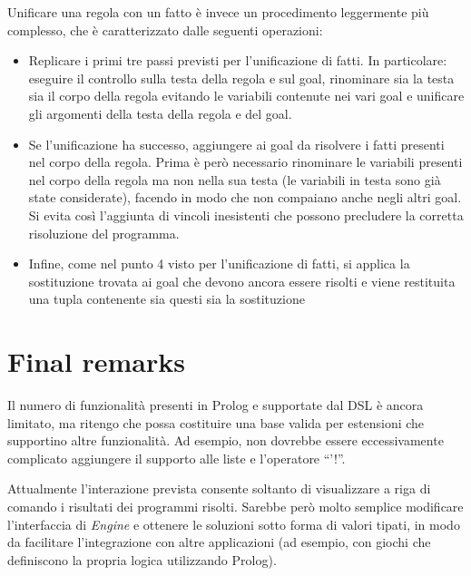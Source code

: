 Unificare una regola con un fatto è invece un procedimento leggermente più complesso, che è caratterizzato dalle seguenti operazioni:

\begin{itemize}
\item Replicare i primi tre passi previsti per l'unificazione di fatti. In particolare: eseguire il controllo sulla testa della regola e sul goal, rinominare sia la testa sia il corpo della regola evitando le variabili contenute nei vari goal e unificare gli argomenti della testa della regola e del goal.
\item Se l'unificazione ha successo, aggiungere ai goal da risolvere i fatti presenti nel corpo della regola. Prima è però necessario rinominare le variabili presenti nel corpo della regola ma non nella sua testa (le variabili in testa sono già state considerate), facendo in modo che non compaiano anche negli altri goal. Si evita così l'aggiunta di vincoli inesistenti che possono precludere la corretta risoluzione del programma.
\item Infine, come nel punto 4 visto per l'unificazione di fatti, si applica la sostituzione trovata ai goal che devono ancora essere risolti e viene restituita una tupla contenente sia questi sia la sostituzione
\end{itemize}


\section{Final remarks}

Il numero di funzionalità presenti in Prolog e supportate dal DSL è ancora limitato, ma ritengo che possa costituire una base valida per estensioni che supportino altre funzionalità. Ad esempio, non dovrebbe essere eccessivamente complicato aggiungere il supporto alle liste e l'operatore ``'!''.

Attualmente l'interazione prevista consente soltanto di visualizzare a riga di comando i risultati dei programmi risolti. Sarebbe però molto semplice modificare l'interfaccia di \textit{Engine} e ottenere le soluzioni sotto forma di valori tipati, in modo da facilitare l'integrazione con altre applicazioni (ad esempio, con giochi che definiscono la propria logica utilizzando Prolog).

